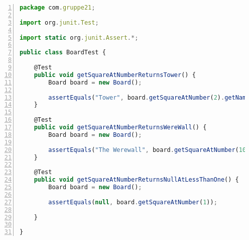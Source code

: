 \begin{lstlisting}[language=JavaScript,numbers=left]
package com.gruppe21;

import org.junit.Test;

import static org.junit.Assert.*;

public class BoardTest {

    @Test
    public void getSquareAtNumberReturnsTower() {
        Board board = new Board();

        assertEquals("Tower", board.getSquareAtNumber(2).getName());
    }

    @Test
    public void getSquareAtNumberReturnsWereWall() {
        Board board = new Board();

        assertEquals("The Werewall", board.getSquareAtNumber(10).getName());
    }

    @Test
    public void getSquareAtNumberReturnsNullAtLessThanOne() {
        Board board = new Board();

        assertEquals(null, board.getSquareAtNumber(1));

    }

}

\end{lstlisting}